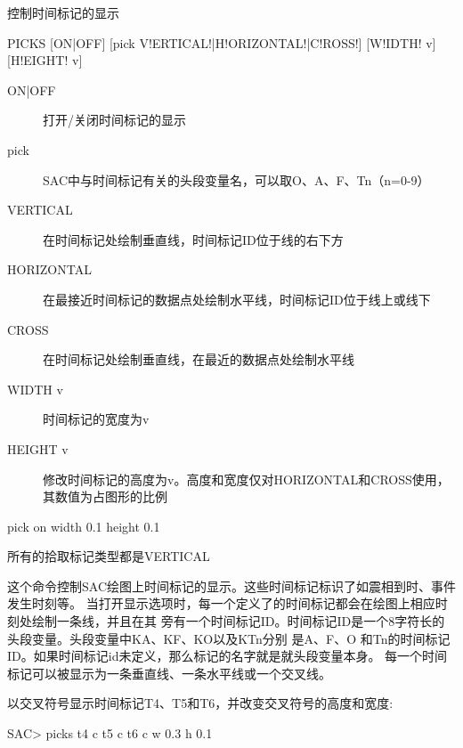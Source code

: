\label{cmd:picks}

控制时间标记的显示

\begin{SACSTX}
PICKS [ON|OFF] [pick V!ERTICAL!|H!ORIZONTAL!|C!ROSS!] [W!IDTH! v] [H!EIGHT! v]
\end{SACSTX}

\begin{description}
\item [ON|OFF] 打开/关闭时间标记的显示
\item [pick] SAC中与时间标记有关的头段变量名，可以取O、A、F、Tn（n=0-9）
\item [VERTICAL] 在时间标记处绘制垂直线，时间标记ID位于线的右下方
\item [HORIZONTAL] 在最接近时间标记的数据点处绘制水平线，时间标记ID位于线上或线下
\item [CROSS] 在时间标记处绘制垂直线，在最近的数据点处绘制水平线
\item [WIDTH v] 时间标记的宽度为v
\item [HEIGHT v] 修改时间标记的高度为v。高度和宽度仅对HORIZONTAL和CROSS使用，其数值为占图形的比例
\end{description}

\begin{SACDFT}
pick on width 0.1 height 0.1
\end{SACDFT}
所有的拾取标记类型都是VERTICAL

这个命令控制SAC绘图上时间标记的显示。这些时间标记标识了如震相到时、事件发生时刻等。
当打开显示选项时，每一个定义了的时间标记都会在绘图上相应时刻处绘制一条线，并且在其
旁有一个时间标记ID。时间标记ID是一个8字符长的头段变量。头段变量中KA、KF、KO以及KTn分别
是A、F、O 和Tn的时间标记ID。如果时间标记id未定义，那么标记的名字就是就头段变量本身。
每一个时间标记可以被显示为一条垂直线、一条水平线或一个交叉线。

以交叉符号显示时间标记T4、T5和T6，并改变交叉符号的高度和宽度:
\begin{SACCode}
SAC> picks t4 c t5 c t6 c w 0.3 h 0.1
\end{SACCode}
